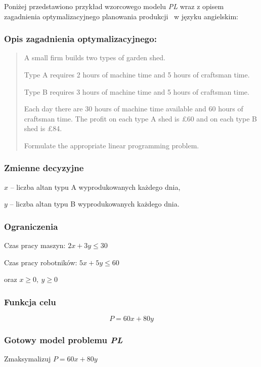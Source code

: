 Poniżej przedstawiono przykład wzorcowego modelu \textit{PL} wraz z opisem zagadnienia optymalizacyjnego planowania produkcji~\cite{cimt} w języku angielskim:

\subsubsection*{Opis zagadnienia optymalizacyjnego:} \label{sec:model_example}
\begin{quote}

A small firm builds two types of garden shed.

Type A requires 2 hours of machine time and 5 hours of craftsman time.

Type B requires 3 hours of machine time and 5 hours of craftsman time.

Each day there are 30 hours of machine time available and 60 hours of craftsman time. The profit on each type A shed is £60 and on each type B shed is £84. 

Formulate the appropriate linear programming problem.
\end{quote}

\subsubsection*{Zmienne decyzyjne}

$x$ – liczba altan typu A wyprodukowanych każdego dnia,

$y$ – liczba altan typu B wyprodukowanych każdego dnia.

\subsubsection*{Ograniczenia}

Czas pracy maszyn: $2x + 3y \leq 30$

Czas pracy robotników: $5x + 5y \leq 60$

oraz $x \geq 0, \ y \geq 0$


\subsubsection*{Funkcja celu}
\[
    P = 60x + 80y
\]

\subsubsection*{Gotowy model problemu \textit{PL}}
    Zmaksymalizuj $P = 60x + 80y$

